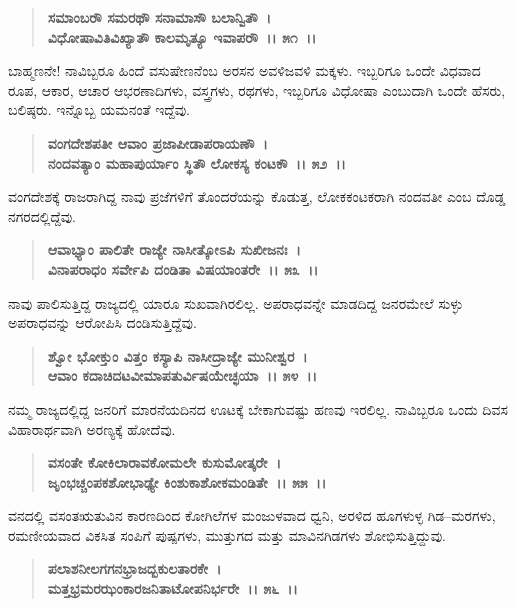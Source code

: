 \begin{verse}
\textbf{ಸಮಾಂಬರೌ ಸಮರಥೌ ಸನಾಮಾಸೌ ಬಲಾನ್ವಿತೌ~।}\\\textbf{ವಿಧೋಷಾವಿತಿವಿಖ್ಯಾತೌ ಕಾಲಮೃತ್ಯೂ ಇವಾಪರೌ‌~।। ೫೧~।। }
\end{verse}

ಬಾಹ್ಮಣನೇ! ನಾವಿಬ್ಬರೂ ಹಿಂದೆ ವಸುಷೇಣನೆಂಬ ಅರಸನ ಅವಳಿಜವಳಿ ಮಕ್ಕಳು. ಇಬ್ಬರಿಗೂ ಒಂದೇ ವಿಧವಾದ ರೂಪ, ಆಕಾರ, ಆಚಾರ ಆಭರಣಾದಿಗಳು, ವಸ್ತ್ರಗಳು, ರಥಗಳು, ಇಬ್ಬರಿಗೂ ವಿಧೋಷಾ ಎಂಬುದಾಗಿ ಒಂದೇ ಹೆಸರು, ಬಲಿಷ್ಠರು. ಇನ್ನೊಬ್ಬ ಯಮನಂತೆ ಇದ್ದೆವು.

\begin{verse}
\textbf{ವಂಗದೇಶಪತೀ ಆವಾಂ ಪ್ರಜಾಪೀಡಾಪರಾಯಣೌ~।}\\\textbf{ನಂದವತ್ಯಾಂ ಮಹಾಪುರ್ಯಾಂ ಸ್ಥಿತೌ ಲೋಕಸ್ಯ ಕಂಟಕೌ~।। ೫೨~।।} 
\end{verse}

ವಂಗದೇಶಕ್ಕೆ ರಾಜರಾಗಿದ್ದ ನಾವು ಪ್ರಜೆಗಳಿಗೆ ತೊಂದರೆಯನ್ನು ಕೊಡುತ್ತ, ಲೋಕಕಂಟಕರಾಗಿ ನಂದವತೀ ಎಂಬ ದೊಡ್ಡ ನಗರದಲ್ಲಿದ್ದೆವು.

\begin{verse}
\textbf{ಆವಾಭ್ಯಾಂ ಪಾಲಿತೇ ರಾಜ್ಯೇ ನಾಸೀತ್ಕೋಽಪಿ ಸುಖೀಜನಃ~।}\\\textbf{ವಿನಾಪರಾಧಂ ಸರ್ವೇಪಿ ದಂಡಿತಾ ವಿಷಯಾಂತರೇ~।। ೫೩~।। }
\end{verse}

ನಾವು ಪಾಲಿಸುತ್ತಿದ್ದ ರಾಜ್ಯದಲ್ಲಿ ಯಾರೂ ಸುಖವಾಗಿರಲಿಲ್ಲ. ಅಪರಾಧವನ್ನೇ ಮಾಡದಿದ್ದ ಜನರಮೇಲೆ ಸುಳ್ಳು ಅಪರಾಧವನ್ನು ಆರೋಪಿಸಿ ದಂಡಿಸುತ್ತಿದ್ದೆವು.

\begin{verse}
\textbf{ಶ್ವೋ ಭೋಕ್ತುಂ ವಿತ್ತಂ ಕಸ್ಯಾಪಿ ನಾಸೀದ್ರಾಜ್ಯೇ ಮುನೀಶ್ವರ~।}\\\textbf{ಆವಾಂ ಕದಾಚಿದಟವೀಮಾಪತುರ್ವಿಷಯೇಚ್ಛಯಾ~।। ೫೪~।। }
\end{verse}

ನಮ್ಮ ರಾಜ್ಯದಲ್ಲಿದ್ದ ಜನರಿಗೆ ಮಾರನೆಯದಿನದ ಊಟಕ್ಕೆ ಬೇಕಾಗುವಷ್ಟು ಹಣವು ಇರಲಿಲ್ಲ. ನಾವಿಬ್ಬರೂ ಒಂದು ದಿವಸ ವಿಹಾರಾರ್ಥವಾಗಿ ಅರಣ್ಯಕ್ಕೆ ಹೋದೆವು.

\begin{verse}
\textbf{ವಸಂತೇ ಕೋಕಿಲಾರಾವಕೋಮಲೇ ಕುಸುಮೋತ್ಕರೇ~।}\\\textbf{ಜೃಂಭಚ್ಚಂಪಕಶೋಭಾಢ್ಯೇ ಕಿಂಶುಕಾಶೋಕಮಂಡಿತೇ~।। ೫೫~।। }
\end{verse}

ವನದಲ್ಲಿ ವಸಂತಋತುವಿನ ಕಾರಣದಿಂದ ಕೋಗಿಲೆಗಳ ಮಂಜುಳವಾದ ಧ್ವನಿ, ಅರಳಿದ ಹೂಗಳುಳ್ಳ ಗಿಡ–ಮರಗಳು, ರಮಣೀಯವಾದ ವಿಕಸಿತ ಸಂಪಿಗೆ ಪುಷ್ಪಗಳು, ಮುತ್ತುಗದ ಮತ್ತು ಮಾವಿನಗಿಡಗಳು ಶೋಭಿಸುತ್ತಿದ್ದುವು.

\begin{verse}
\textbf{ಪಲಾಶನೀಲಗಗನಭ್ರಾಜದ್ಬಕುಲತಾರಕೇ~।}\\\textbf{ಮತ್ತಭ್ರಮರಝಂಕಾರಜನಿತಾಟೋಪನಿರ್ಭರೇ~।। ೫೬~।।} 
\end{verse}

